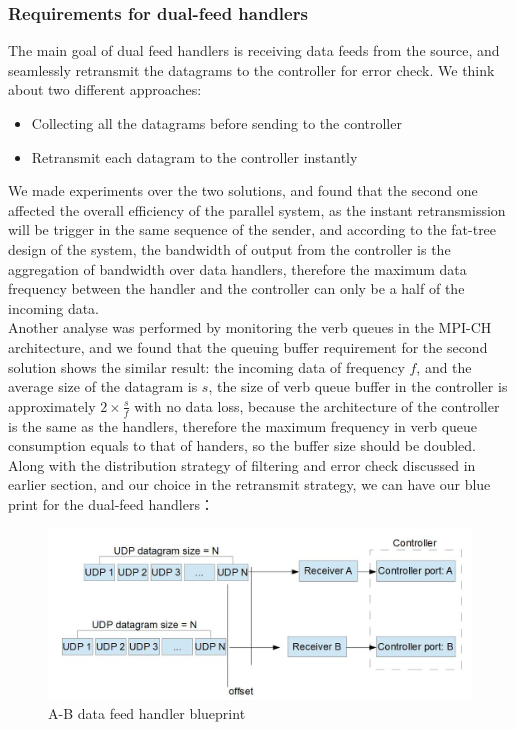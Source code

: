 \documentclass[11pt,openright,a4paper]{report}
\begin{document}
\subsubsection{Requirements for dual-feed handlers}
The main goal of dual feed handlers is receiving data feeds from the source, and seamlessly retransmit the datagrams to the controller for error check. We think about two different approaches:
\begin{itemize}
	\item Collecting all the datagrams before sending to the controller
	\item Retransmit each datagram to the controller instantly
\end{itemize}
We made experiments over the two solutions, and found that the second one affected the overall efficiency of the parallel system, as the instant retransmission will be trigger in the same sequence of the sender, and according to the fat-tree design of the system, the bandwidth of output from the controller is the aggregation of bandwidth over data handlers, therefore the maximum data frequency between the handler and the controller can only be a half of the incoming data.\\
Another analyse was performed by monitoring the verb queues in the MPI-CH architecture, and we found that the queuing buffer requirement for the second solution shows the similar result: the incoming data of frequency $f$, and the average size of the datagram is $s$, the size of verb queue buffer in the controller is approximately $2\times \frac{s}{f}$ with no data loss, because the architecture of the controller is the same as the handlers, therefore the maximum frequency in verb queue consumption equals to that of handers, so the buffer size should be doubled.\\
Along with the distribution strategy of filtering and error check discussed in earlier section, and our choice in the retransmit strategy, we can have our blue print for the dual-feed handlers：
\begin{figure}[H]
\centering
\includegraphics[width=0.7\linewidth]{picture/receiverBlueprint}
\caption{A-B data feed handler blueprint}
\label{fig:receiverBlueprint}
\end{figure}
\end{document}
